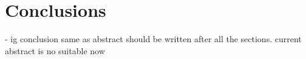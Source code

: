 \section{Conclusions}\label{sec:conclusions} %
- ig conclusion same as abstract should be written after all the sections. current abstract is no suitable now